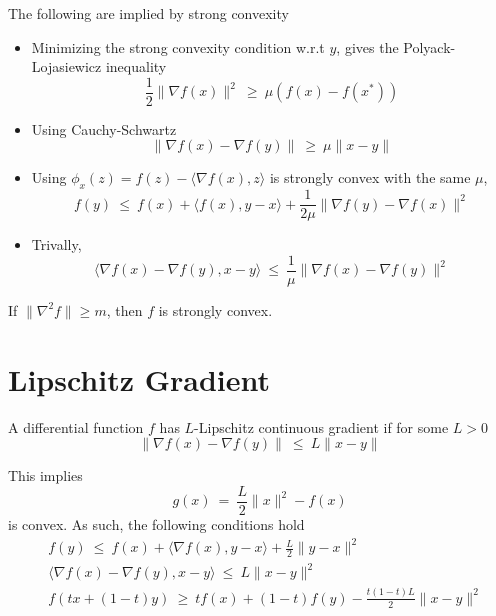 \documentclass{article}
\begin{document}
The following are implied by strong convexity
\begin{itemize}
    \item Minimizing the strong convexity condition w.r.t $y$, gives the Polyack-Lojasiewicz inequality
    \begin{equation}
        \frac{1}{2}\|\nabla f(x)\|^2\ \geq\ \mu(f(x) - f(x^*))
    \end{equation}
    \item Using Cauchy-Schwartz
    \begin{equation}
        \|\nabla f(x) - \nabla f(y)\|\ \geq\ \mu\|x-y\|
    \end{equation}
    \item Using $\phi_x(z) = f(z) - \langle\nabla f(x), z\rangle$ is strongly convex with the same $\mu$,
    \begin{equation}
        f(y)\ \leq\ f(x) + \langle f(x), y-x\rangle + \frac{1}{2\mu}\|\nabla f(y) - \nabla f(x)\|^2
    \end{equation}
    \item Trivally,
    \begin{equation}
        \langle \nabla f(x) - \nabla f(y), x - y\rangle\ \leq\ \frac{1}{\mu}\|\nabla f(x) - \nabla f(y)\|^2
    \end{equation}
\end{itemize}

If $\|\nabla^2 f\|\geq m$, then $f$ is strongly convex.

\newpage
\section{Lipschitz Gradient}
A differential function $f$ has $L$-Lipschitz continuous gradient if for some $L>0$
\begin{equation}
    \|\nabla f(x) - \nabla f(y)\|\ \leq\ L\|x-y\|
\end{equation}

This implies
\begin{equation}
    g(x)\ =\ \frac{L}{2}\|x\|^2 - f(x)
\end{equation}
is convex. As such, the following conditions hold
\begin{align}
    &f(y)\ \leq\ f(x) + \langle \nabla f(x), y-x\rangle + \frac{L}{2}\|y-x\|^2\\
    &\langle \nabla f(x) - \nabla f(y), x - y\rangle\ \leq\ L\|x-y\|^2\\
    &f(tx + (1-t)y)\ \geq\ tf(x) + (1-t)f(y) - \frac{t(1-t)L}{2}\|x-y\|^2
\end{align}
\end{document}
